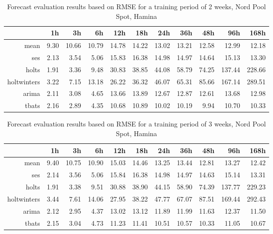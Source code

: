 \begin{table}[ht]
\centering
\begin{tabular}{rrrrrrrrrrr}
  \hline
 & 1h & 3h & 6h & 12h & 18h & 24h & 36h & 48h & 96h & 168h \\ 
  \hline
mean & 9.30 & 10.66 & 10.79 & 14.78 & 14.22 & 13.02 & 13.21 & 12.58 & 12.99 & 12.18 \\ 
  ses & 2.13 & 3.54 & 5.06 & 15.83 & 16.38 & 14.98 & 14.97 & 14.64 & 15.13 & 13.30 \\ 
  holts & 1.91 & 3.36 & 9.48 & 30.83 & 38.85 & 44.08 & 58.79 & 74.25 & 137.44 & 228.66 \\ 
  holtwinters & 3.22 & 7.15 & 13.18 & 26.22 & 36.32 & 46.07 & 65.31 & 85.66 & 167.14 & 289.51 \\ 
  arima & 2.11 & 3.08 & 4.65 & 13.66 & 13.89 & 12.67 & 12.87 & 12.61 & 13.68 & 12.98 \\ 
  tbats & 2.16 & 2.89 & 4.35 & 10.68 & 10.89 & 10.02 & 10.19 & 9.94 & 10.70 & 10.33 \\ 
   \hline
\end{tabular}
\caption{Forecast evaluation results based on RMSE for a training period of 2 weeks, Nord Pool Spot, Hamina}
\label{tab:app_results_hamina_2weeks}
\end{table}
\begin{table}[ht]
\centering
\begin{tabular}{rrrrrrrrrrr}
  \hline
 & 1h & 3h & 6h & 12h & 18h & 24h & 36h & 48h & 96h & 168h \\ 
  \hline
mean & 9.40 & 10.75 & 10.90 & 15.03 & 14.46 & 13.25 & 13.44 & 12.81 & 13.27 & 12.42 \\ 
  ses & 2.14 & 3.56 & 5.06 & 15.84 & 16.38 & 14.98 & 14.97 & 14.63 & 15.14 & 13.31 \\ 
  holts & 1.91 & 3.38 & 9.51 & 30.88 & 38.90 & 44.15 & 58.90 & 74.39 & 137.77 & 229.23 \\ 
  holtwinters & 3.44 & 7.61 & 14.06 & 27.95 & 38.22 & 47.77 & 67.07 & 87.51 & 169.44 & 292.43 \\ 
  arima & 2.12 & 2.95 & 4.37 & 13.02 & 13.12 & 11.89 & 11.99 & 11.63 & 12.37 & 11.50 \\ 
  tbats & 2.15 & 3.04 & 4.73 & 11.23 & 11.41 & 10.51 & 10.57 & 10.33 & 11.05 & 10.67 \\ 
   \hline
\end{tabular}
\caption{Forecast evaluation results based on RMSE for a training period of 3 weeks, Nord Pool Spot, Hamina}
\label{tab:app_results_hamina_3weeks}
\end{table}
